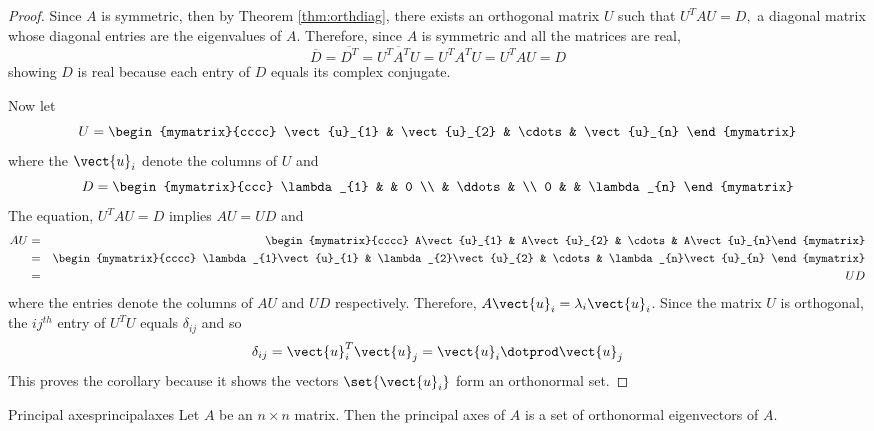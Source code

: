 \begin{proof}
Since $A$ is symmetric, then by Theorem \ref{thm:orthdiag},
there exists an orthogonal matrix $U$ such that $U^{T}AU=D,$ a diagonal
matrix whose diagonal entries are the eigenvalues of $A.$ Therefore, since $
A $ is symmetric and all the matrices are real, 
\begin{equation*}
\overline{D}=\overline{D^{T}}=\overline{U^{T}A^{T}U}=U^{T}A^{T}U=U^{T}AU=D
\end{equation*}
showing $D$ is real because each entry of $D$ equals its complex conjugate.

Now let 
\begin{equation*}
U=\begin{mymatrix}{cccc}
\vect{u}_{1} & \vect{u}_{2} & \cdots & \vect{u}_{n}
\end{mymatrix}
\end{equation*}
where the $\vect{u}_{i}$ denote the columns of $U$ and 
\begin{equation*}
D=\begin{mymatrix}{ccc}
\lambda _{1} &  & 0 \\ 
& \ddots &  \\ 
0 &  & \lambda _{n}
\end{mymatrix}
\end{equation*}
The equation, $U^{T}AU=D$ implies $AU = UD$ and 
\begin{eqnarray*}
AU &=&\begin{mymatrix}{cccc}
A\vect{u}_{1} & A\vect{u}_{2} & \cdots & A\vect{u}_{n}%
\end{mymatrix} \\
&=&\begin{mymatrix}{cccc}
\lambda _{1}\vect{u}_{1} & \lambda _{2}\vect{u}_{2} & \cdots & \lambda
_{n}\vect{u}_{n}
\end{mymatrix} \\
&=& UD
\end{eqnarray*}
where the entries denote the columns of $AU$ and $UD$ respectively.
Therefore, $A\vect{u}_{i}=\lambda _{i}\vect{u}_{i}$.  Since the matrix $U$
is orthogonal, the $ij^{th}$ entry of $U^{T}U$ equals $\delta _{ij}$ and so 
\begin{equation*}
\delta _{ij}=\vect{u}_{i}^{T}\vect{u}_{j}=\vect{u}_{i}\dotprod \vect{u}
_{j}
\end{equation*}
This proves the corollary because it shows the vectors $\set{\vect{u}
_{i}} $ form an orthonormal set.
\end{proof}

\begin{definition}{Principal axes}{principalaxes}
Let $A$ be an $n \times n$ matrix. Then the principal axes of $A$ is a set of orthonormal eigenvectors of $A$.
\end{definition}

